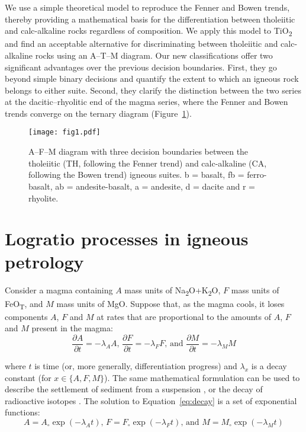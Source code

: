 \documentclass{article}
\begin{document}
We use a simple theoretical model to reproduce the Fenner and Bowen
trends, thereby providing a mathematical basis for the differentiation
between tholeiitic and calc-alkaline rocks regardless of
composition. We apply this model to TiO\textsubscript{2} and find an
acceptable alternative for discriminating between tholeiitic and
calc-alkaline rocks using an A--T--M diagram. Our new classifications
offer two significant advantages over the previous decision
boundaries. First, they go beyond simple binary decisions and quantify
the extent to which an igneous rock belongs to either suite. Second,
they clarify the distinction between the two series at the
dacitic–rhyolitic end of the magma series, where the Fenner and Bowen
trends converge on the ternary diagram (Figure~\ref{fig:AFM}).

\begin{figure}[!ht]
  \centering
  \texttt{[image: fig1.pdf]}
  \caption{
    A--F--M diagram with three decision boundaries between the
    tholeiitic (TH, following the Fenner trend) and calc-alkaline (CA,
    following the Bowen trend) igneous suites. b = basalt, fb =
    ferro-basalt, ab = andesite-basalt, a = andesite, d = dacite and r =
    rhyolite.}
  \label{fig:AFM}
\end{figure}

\section{Logratio processes in igneous petrology}
\label{sec:logratio-processes}

Consider a magma containing $A$ mass units of
Na\textsubscript{2}O+K\textsubscript{2}O, $F$ mass units of
FeO\textsubscript{T}, and $M$ mass units of MgO. Suppose that, as the
magma cools, it loses components $A$, $F$ and $M$ at rates that are
proportional to the amounts of $A$, $F$ and $M$ present in the magma:
\begin{equation}
  \frac{\partial A}{\partial t} = -\lambda_A A \mbox{,~}
  \frac{\partial F}{\partial t} = -\lambda_F F \mbox{,~and~}
  \frac{\partial M}{\partial t} = -\lambda_M M
  \label{eq:decay}
\end{equation}

\noindent where $t$ is time (or, more generally, differentiation
progress) and $\lambda_x$ is a decay constant (for $x \in \{A, F,
M\}$). The same mathematical formulation can be used to describe the
settlement of sediment from a suspension \citep{egozcue2003}, or the
decay of radioactive isotopes \citep{rutherford1902a}.  The solution
to Equation~\ref{eq:decay} is a set of exponential functions:
\begin{equation}
  A = A_\circ \exp(-\lambda_A t) \mbox{,~}
  F = F_\circ \exp(-\lambda_F t) \mbox{,~and~}
  M = M_\circ \exp(-\lambda_M t)
  \label{eq:expdecay}
\end{equation}
\end{document}
